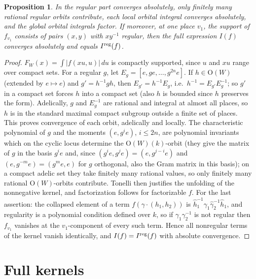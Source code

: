 \documentclass[11pt,oneside,notitlepage]{book}
\numberwithin{equation}{section}
\theoremstyle{plain}
\newtheorem{proposition}[theorem]{Proposition}
\theoremstyle{definition}
\newcommand{\Ort}{\mathrm{O}}
\begin{document}
\begin{proposition}\label{prop:A-orth}
In  the regular part converges absolutely, only finitely many rational regular orbits contribute, each local orbital integral converges absolutely, and the global orbital integrals factor. If moreover, at one place $v_1$, the support of $f_{v_1}$ consists of pairs $(x,y)$ with $xy^{-1}$ regular, then the full expression $I(f)$ converges absolutely and equals $I^{\rm reg}(f)$.
\end{proposition}
\begin{proof}
$F_W(x)=\int|f(xu,u)|\,du$ is compactly supported, since $u$ and $xu$ range over compact sets. For a regular $g$, let $E_g=[e,ge,\dots,g^{2n}e]$. If $h\in\Ort(W)$ (extended by $e\mapsto e$) and $g'=h^{-1}gh$, then $E_{g'}=h^{-1}E_g$, i.e.\ $h^{-1}=E_{g'}E_g^{-1}$; so $g'$ in a compact set forces $h$ into a compact set (also $h$ is bounded since $h$ preserves the form). Adelically, $g$ and $E_g^{-1}$ are rational and integral at almost all places, so $h$ is in the standard maximal compact subgroup outside a finite set of places. This proves convergence of each orbit, adelically and locally. The characteristic polynomial of $g$ and the moments $(e,g^ie)$, $i\le 2n$, are polynomial invariants which on the cyclic locus determine the $\Ort(W)(k)$-orbit (they give the matrix of $g$ in the basis $g^ie$ and, since $(g^ie,g^je)=(e,g^{j-i}e)$ and $(e,g^{-m}e)=(g^me,e)$ for $g$ orthogonal, also the Gram matrix in this basis); on a compact adelic set they take finitely many rational values, so only finitely many rational $\Ort(W)$-orbits contribute. Tonelli then justifies the unfolding of the nonnegative kernel, and factorization follows for factorizable $f$. For the last assertion: the collapsed element of a term $f(\gamma\cdot(h_1,h_2))$ is $\widehat h_1^{-1}\gamma_1\widehat\gamma_2^{-1}\widehat h_1$, and regularity is a polynomial condition defined over $k$, so if $\gamma_1\gamma_2^{-1}$ is not regular then $f_{v_1}$ vanishes at the $v_1$-component of every such term. Hence all nonregular terms of the kernel vanish identically, and $I(f)=I^{\rm reg}(f)$ with absolute convergence.
\end{proof}

\section{Full kernels}
\end{document}
